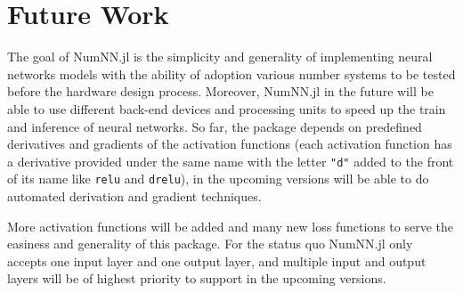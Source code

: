 \section{Future Work}

The goal of NumNN.jl is the simplicity and generality of implementing neural networks models with the ability of adoption various number systems to be tested before the hardware design process. Moreover, NumNN.jl in the future will be able to use different back-end devices and processing units to speed up the train and inference of neural networks. So far, the package depends on predefined derivatives and gradients of the activation functions (each activation function has a derivative provided under the same name with the letter \texttt{"d"} added to the front of its name like \texttt{relu} and \texttt{drelu}), in the upcoming versions will be able to do automated derivation and gradient techniques.

More activation functions will be added and many new loss functions to serve the easiness and generality of this package. For  the status quo NumNN.jl only accepts one input layer and one output layer, and multiple input and output layers will be of highest priority to support in the upcoming versions.